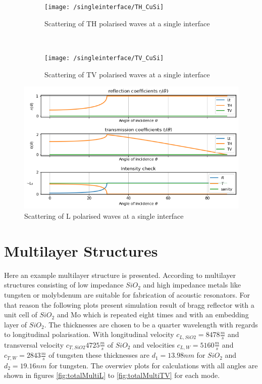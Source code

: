 \begin{figure}[p]
    \centering
    \begin{subfigure}{0.8\textwidth}
        \texttt{[image: /singleinterface/TH\_CuSi]}
        \caption{Scattering of TH polarised waves at a single interface}
        \label{fig:singleL}
    \end{subfigure}\\ \vspace{0.75cm}
    \begin{subfigure}{0.8\textwidth}
        \texttt{[image: /singleinterface/TV\_CuSi]}
        \caption{Scattering of TV polarised waves at a single interface}
    \end{subfigure}
    \caption{}
    \label{fig:restsingle}
\end{figure}

\begin{figure}[p]
    \centering
    \includegraphics[width=\textwidth]{../pictures/singleinterface/TH_CuSi}
    \caption{Scattering of L polarised waves at a single interface}
    \label{fig:singleL}
\end{figure}

\section{Multilayer Structures}
Here an example multilayer structure is presented. According to
\cite{Satoh2005} multilayer structures consisting of low impedance
$\si{SiO_2}$ and high impedance metals like tungsten or molybdenum are
suitable for fabrication of acoustic resonators. For that reason the following
plots present simulation result of bragg reflector with a unit cell of
$\si{SiO_2}$ and Mo which is repeated eight times and with an embedding layer
of $\si{SiO_2}$. The thicknesses are chosen to be a quarter wavelength with
regards to longitudinal polarisation. With longitudinal velocity
$c_{L,SiO2}=8478\si{\frac{m}{s}}$
and transversal velocity $c_{T,SiO2} 4725\si{\frac{m}{s}}$ of $\si{SiO_2}$ and
velocities $c_{L,W} = 5160\si{\frac{m}{s}}$ and $ c_{T,W} = 2843\si{\frac{m}{s}}$ 
of tungsten  these thicknesses are
$d_1=13.98\si{nm}$ for $\si{SiO_2}$ and $d_2 = 19.16\si{nm}$ for tungsten.
The overwiev plots for calculations with all angles are shown in figures
\ref{fig:totalMultiL} to \ref{fig:totalMultiTV} for each mode.

